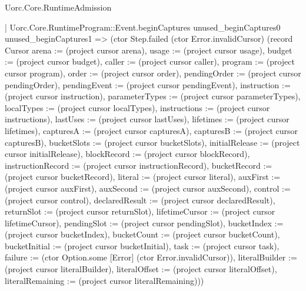 \begin{lexlean}{Uorc.Core.RuntimeAdmission}
\begin{semanticmodule}
{          | Uorc.Core.RuntimeProgram::Event.beginCaptures unused_beginCaptures0 unused_beginCaptures1 => (ctor Step.failed (ctor Error.invalidCursor) (record Cursor {arena := (project cursor arena), usage := (project cursor usage), budget := (project cursor budget), caller := (project cursor caller), program := (project cursor program), order := (project cursor order), pendingOrder := (project cursor pendingOrder), pendingEvent := (project cursor pendingEvent), instruction := (project cursor instruction), parameterTypes := (project cursor parameterTypes), localTypes := (project cursor localTypes), instructions := (project cursor instructions), lastUses := (project cursor lastUses), lifetimes := (project cursor lifetimes), capturesA := (project cursor capturesA), capturesB := (project cursor capturesB), bucketSlots := (project cursor bucketSlots), initialRelease := (project cursor initialRelease), blockRecord := (project cursor blockRecord), instructionRecord := (project cursor instructionRecord), bucketRecord := (project cursor bucketRecord), literal := (project cursor literal), auxFirst := (project cursor auxFirst), auxSecond := (project cursor auxSecond), control := (project cursor control), declaredResult := (project cursor declaredResult), returnSlot := (project cursor returnSlot), lifetimeCursor := (project cursor lifetimeCursor), pendingSlot := (project cursor pendingSlot), bucketIndex := (project cursor bucketIndex), bucketCount := (project cursor bucketCount), bucketInitial := (project cursor bucketInitial), task := (project cursor task), failure := (ctor Option.some [Error] (ctor Error.invalidCursor)), literalBuilder := (project cursor literalBuilder), literalOffset := (project cursor literalOffset), literalRemaining := (project cursor literalRemaining)}))
}
\end{semanticmodule}
\end{lexlean}
